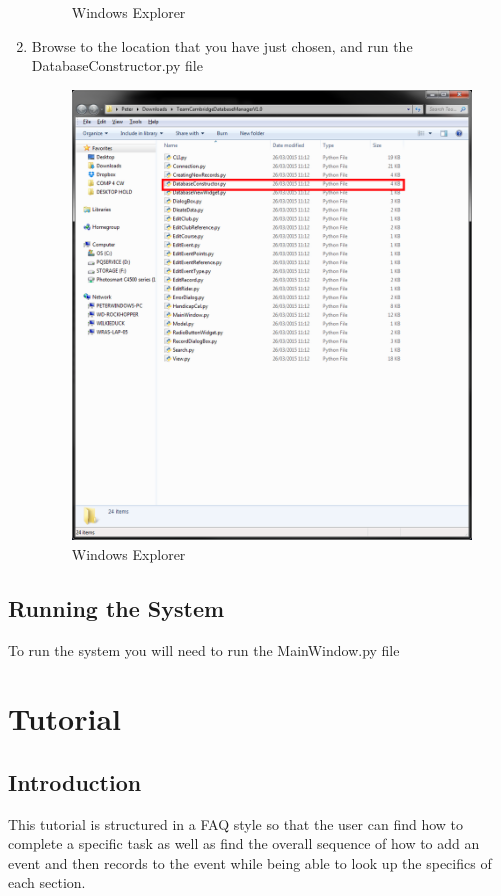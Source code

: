\begin{enumerate}
\begin{figure}[H]
\caption{Windows Explorer} \label{fig:SyIsP4}
\end{figure}
\item Browse to the location that you have just chosen, and run the DatabaseConstructor.py file
\begin{figure}[H]
\includegraphics[width=\textwidth]{./Manual/SystemInstall/Part5.png}
\caption{Windows Explorer} \label{fig:SyIsP5}
\end{figure}
\end{enumerate}
\subsection{Running the System}
To run the system you will need to run the MainWindow.py file
\section{Tutorial}

\subsection{Introduction}
This tutorial is structured in a FAQ style so that the user can find how to complete a specific task as well as find the overall sequence of how to add an event and then records to the event while being able to look up the specifics of each section. 

